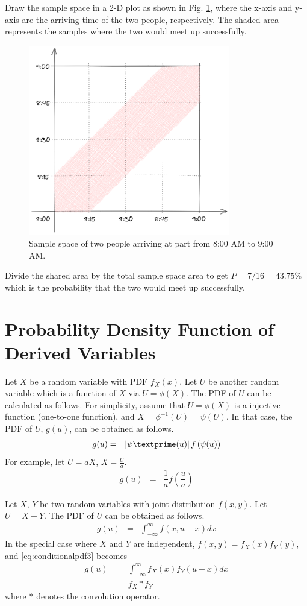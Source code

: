 Draw the sample space in a 2-D plot as shown in Fig. \ref{fig:geometricprobexp}, where the x-axis and y-axis are the arriving time of the two people, respectively. The shaded area represents the samples where the two would meet up successfully.
\begin{figure}
	\centering
	\includegraphics[width=250pt]{chapters/ch-random-variables/figures/geometricprobexp.png}
	\caption{Sample space of two people arriving at part from 8:00 AM to 9:00 AM.} \label{fig:geometricprobexp}
\end{figure}
Divide the shared area by the total sample space area to get $P=7/16=43.75\%$ which is the probability that the two would meet up successfully.

\section{Probability Density Function of Derived Variables}

Let $X$ be a random variable with PDF $f_X(x)$. Let $U$ be another random variable which is a function of $X$ via $U=\phi(X)$. The PDF of $U$ can be calculated as follows. For simplicity, assume that $U=\phi(X)$ is a injective function (one-to-one function), and $X=\phi^{-1}(U)=\psi(U)$. In that case, the PDF of $U$, $g(u)$, can be obtained as follows.
\begin{eqnarray}
  g(u) &=& \left|\psi\textprime(u)\right|f\left(\psi(u)\right) \nonumber
\end{eqnarray}
For example, let $U=aX$, $X=\frac{U}{a}$.
\begin{eqnarray}
  g(u) &=& \dfrac{1}{a}f\left(\dfrac{u}{a}\right) \nonumber
\end{eqnarray}

Let $X$, $Y$ be two random variables with joint distribution $f(x, y)$. Let $U=X+Y$. The PDF of $U$ can be obtained as follows.
\begin{eqnarray}
  g(u) &=& \int_{-\infty}^{\infty} f(x, u-x)dx \label{eq:conditionalpdf3}
\end{eqnarray}
In the special case where $X$ and $Y$ are independent, $f(x, y) = f_X(x)f_Y(y)$, and \eqref{eq:conditionalpdf3} becomes
\begin{eqnarray}
  g(u) &=& \int_{-\infty}^{\infty} f_X(x)f_Y(u-x)dx \nonumber \\
  &=& f_X * f_Y \nonumber
\end{eqnarray}
where $*$ denotes the convolution operator.
